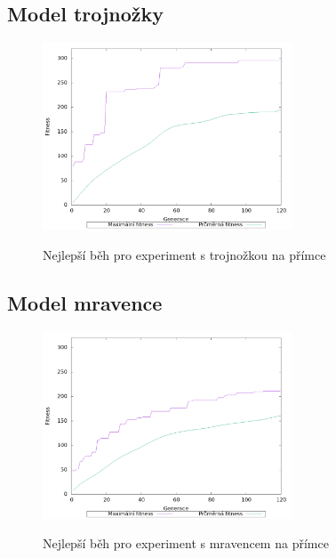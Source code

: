 \subsection{Model trojnožky}
\begin{figure}[h]
    \centering
    {\includegraphics[width=20em]{obrazky/trojnozka_primka_fitness_prubeh.png}}
    \caption{
        Nejlepší běh pro experiment s trojnožkou na přímce
    }
    \label{fig:trojnozka_primka_fitness_prubeh}
\end{figure}

\subsection{Model mravence}

\begin{figure}[h]
    \centering
    {\includegraphics[width=20em]{obrazky/mravenec_primka_fitness_prubeh.png}}
    \caption{
    Nejlepší běh pro experiment s mravencem na přímce
    }
    \label{fig:mravenec_primka_fitness_prubeh}
\end{figure}


